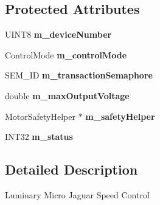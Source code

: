 \subsection*{\-Protected \-Attributes}
\begin{DoxyCompactItemize}
\item 
\hypertarget{class_l_r_t_c_a_n_jaguar_ade31101f436495618848a545efc0d03e}{
\-U\-I\-N\-T8 {\bfseries m\-\_\-device\-Number}}
\label{class_l_r_t_c_a_n_jaguar_ade31101f436495618848a545efc0d03e}

\item 
\hypertarget{class_l_r_t_c_a_n_jaguar_af172ea4b9c50a30dff8392a88788747f}{
\-Control\-Mode {\bfseries m\-\_\-control\-Mode}}
\label{class_l_r_t_c_a_n_jaguar_af172ea4b9c50a30dff8392a88788747f}

\item 
\hypertarget{class_l_r_t_c_a_n_jaguar_a76a88e9de22fd5d90c49dcdfc2ca8766}{
\-S\-E\-M\-\_\-\-I\-D {\bfseries m\-\_\-transaction\-Semaphore}}
\label{class_l_r_t_c_a_n_jaguar_a76a88e9de22fd5d90c49dcdfc2ca8766}

\item 
\hypertarget{class_l_r_t_c_a_n_jaguar_a301dfac2c55376e77303209b78ab1feb}{
double {\bfseries m\-\_\-max\-Output\-Voltage}}
\label{class_l_r_t_c_a_n_jaguar_a301dfac2c55376e77303209b78ab1feb}

\item 
\hypertarget{class_l_r_t_c_a_n_jaguar_ac30146f410d3573240f49f3de26e9d6d}{
\-Motor\-Safety\-Helper $\ast$ {\bfseries m\-\_\-safety\-Helper}}
\label{class_l_r_t_c_a_n_jaguar_ac30146f410d3573240f49f3de26e9d6d}

\item 
\hypertarget{class_l_r_t_c_a_n_jaguar_ac6fd4860ed4324409fa023635bc889f4}{
\-I\-N\-T32 {\bfseries m\-\_\-status}}
\label{class_l_r_t_c_a_n_jaguar_ac6fd4860ed4324409fa023635bc889f4}

\end{DoxyCompactItemize}


\subsection{\-Detailed \-Description}
\-Luminary \-Micro \-Jaguar \-Speed \-Control 

